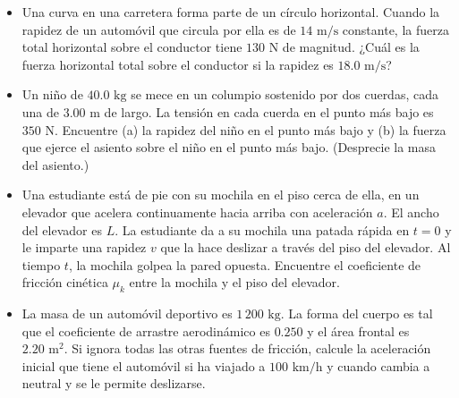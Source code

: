 \documentclass[11pt,a4paper]{article}
\begin{document}
\begin{itemize}
    \item[\textbf{21.}] Una curva en una carretera forma parte de un círculo horizontal. Cuando la rapidez de un automóvil que circula por ella es de $14 \text{ m/s}$ constante, la fuerza total horizontal sobre el conductor tiene $130 \text{ N}$ de magnitud. ¿Cuál es la fuerza horizontal total sobre el conductor si la rapidez es $18.0 \text{ m/s}$?
    \vspace*{5cm}

    \item[\textbf{22.}] Un niño de $40.0 \text{ kg}$ se mece en un columpio sostenido por dos cuerdas, cada una de $3.00 \text{ m}$ de largo. La tensión en cada cuerda en el punto más bajo es $350 \text{ N}$. Encuentre (a) la rapidez del niño en el punto más bajo y (b) la fuerza que ejerce el asiento sobre el niño en el punto más bajo. (Desprecie la masa del asiento.)
    \vspace*{6cm}

    \item[\textbf{23.}] Una estudiante está de pie con su mochila en el piso cerca de ella, en un elevador que acelera continuamente hacia arriba con aceleración $a$. El ancho del elevador es $L$. La estudiante da a su mochila una patada rápida en $t = 0$ y le imparte una rapidez $v$ que la hace deslizar a través del piso del elevador. Al tiempo $t$, la mochila golpea la pared opuesta. Encuentre el coeficiente de fricción cinética $\mu_k$ entre la mochila y el piso del elevador.
    \vspace*{7cm}

    \item[\textbf{24.}] La masa de un automóvil deportivo es $1\,200 \text{ kg}$. La forma del cuerpo es tal que el coeficiente de arrastre aerodinámico es $0.250$ y el área frontal es $2.20 \text{ m}^2$. Si ignora todas las otras fuentes de fricción, calcule la aceleración inicial que tiene el automóvil si ha viajado a $100 \text{ km/h}$ y cuando cambia a neutral y se le permite deslizarse.
    \vspace*{6cm}
\end{itemize}

\newpage
\end{document}
